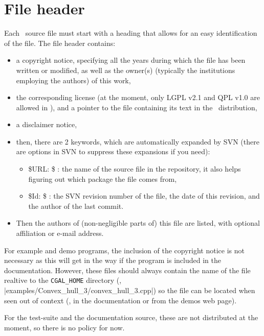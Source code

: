 \section{File header\label{sec:file_header}}

Each \cgal\ source file must start with a heading that allows for an easy
identification of the file.  The file header contains:
\begin{itemize}
\item a copyright notice, specifying all the years during which the file has
been written or modified, as well as the owner(s) (typically the institutions
employing the authors) of this work,
\item the corresponding license (at the moment, only LGPL v2.1 and QPL v1.0
are allowed in \cgal), and a pointer to the file containing its text in the
\cgal\ distribution,
\item a disclaimer notice,
\item then, there are 2 keywords, which are automatically expanded by SVN
(there are options in SVN to suppress these expansions if you need):
\begin{itemize}
\item \${}URL: \$ : the name of the source file in the repository, it also
helps figuring out which package the file comes from,
\item \${}Id: \$ : the SVN revision number of the file, the date of this revision,
and the author of the last commit.
\end{itemize}
\item Then the authors of (non-negligible parts of) this file are listed, with
optional affiliation or e-mail address.
\end{itemize}

For example and demo programs, the inclusion of the copyright notice is not
necessary as this will get in the way if the program is included in the
documentation.  However, these files should always contain the name of
the file realtive to the \texttt{CGAL\_HOME} directory
(\eg, \nonlinkedpath|examples/Convex_hull_3/convex_hull_3.cpp|)
so the file can be located when seen out of context (\eg, in the documentation
or from the demos web page).

For the test-suite and the documentation source, these are not distributed at
the moment, so there is no policy for now.

\InternalOnly{

}


